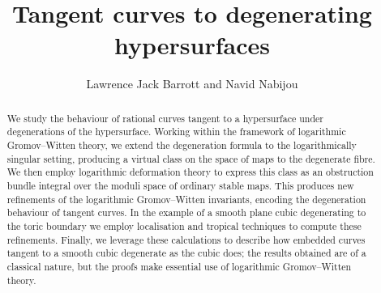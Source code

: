 \documentclass[11pt]{amsart}
\theoremstyle{definition}
\theoremstyle{definition}
\begin{document}
 
\title{Tangent curves to degenerating hypersurfaces}
\author{Lawrence Jack Barrott and Navid Nabijou}

\begin{abstract}
We study the behaviour of rational curves tangent to a hypersurface under degenerations of the hypersurface. Working within the framework of logarithmic Gromov--Witten theory, we extend the degeneration formula to the logarithmically singular setting, producing a virtual class on the space of maps to the degenerate fibre. We then employ logarithmic deformation theory to express this class as an obstruction bundle integral over the moduli space of ordinary stable maps. This produces new refinements of the logarithmic Gromov--Witten invariants, encoding the degeneration behaviour of tangent curves. In the example of a smooth plane cubic degenerating to the toric boundary we employ localisation and tropical techniques to compute these refinements. Finally, we leverage these calculations to describe how embedded curves tangent to a smooth cubic degenerate as the cubic does; the results obtained are of a classical nature, but the proofs make essential use of logarithmic Gromov--Witten theory.
\end{abstract}

\maketitle
\tableofcontents

\newpage

\null
\vfill
\end{document}
